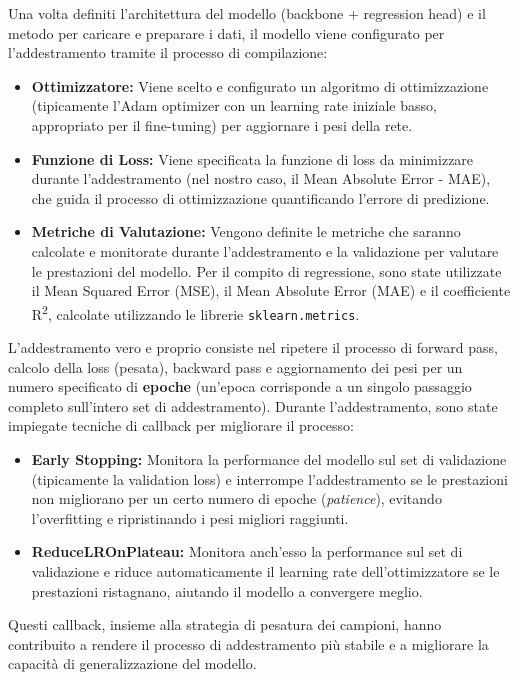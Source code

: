 Una volta definiti l'architettura del modello (backbone + regression head) e il metodo per caricare e preparare i dati, il modello viene configurato per l'addestramento tramite il processo di compilazione:
\begin{itemize}
    \item \textbf{Ottimizzatore:} Viene scelto e configurato un algoritmo di ottimizzazione (tipicamente l'Adam optimizer con un learning rate iniziale basso, appropriato per il fine-tuning) per aggiornare i pesi della rete.
    \item \textbf{Funzione di Loss:} Viene specificata la funzione di loss da minimizzare durante l'addestramento (nel nostro caso, il Mean Absolute Error - MAE), che guida il processo di ottimizzazione quantificando l'errore di predizione.
    \item \textbf{Metriche di Valutazione:} Vengono definite le metriche che saranno calcolate e monitorate durante l'addestramento e la validazione per valutare le prestazioni del modello. Per il compito di regressione, sono state utilizzate il Mean Squared Error (MSE), il Mean Absolute Error (MAE) e il coefficiente R\textsuperscript{2}, calcolate utilizzando le librerie \texttt{sklearn.metrics}.
\end{itemize}

L'addestramento vero e proprio consiste nel ripetere il processo di forward pass, calcolo della loss (pesata), backward pass e aggiornamento dei pesi per un numero specificato di \textbf{epoche} (un'epoca corrisponde a un singolo passaggio completo sull'intero set di addestramento). Durante l'addestramento, sono state impiegate tecniche di callback per migliorare il processo:
\begin{itemize}
    \item \textbf{Early Stopping:} Monitora la performance del modello sul set di validazione (tipicamente la validation loss) e interrompe l'addestramento se le prestazioni non migliorano per un certo numero di epoche (\textit{patience}), evitando l'overfitting e ripristinando i pesi migliori raggiunti.
    \item \textbf{ReduceLROnPlateau:} Monitora anch'esso la performance sul set di validazione e riduce automaticamente il learning rate dell'ottimizzatore se le prestazioni ristagnano, aiutando il modello a convergere meglio.
\end{itemize}
Questi callback, insieme alla strategia di pesatura dei campioni, hanno contribuito a rendere il processo di addestramento più stabile e a migliorare la capacità di generalizzazione del modello.

